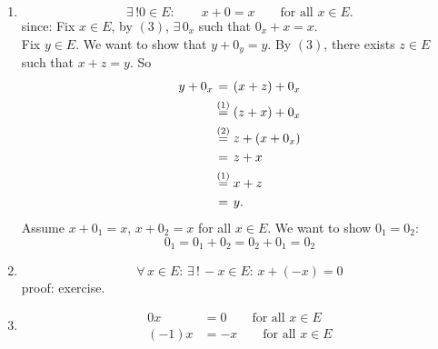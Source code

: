 \begin{bemerkung}
	\begin{enumerate}[(1)]
		\item \[
			\exists\,! 0 \in E: \qquad x + 0 = x \qquad \text{for all }x \in E.
		\]
		since: Fix $x \in E$, by $(3)$, $\exists\, 0_x$ such that $0_x + x =x$. \\
		Fix $y \in E$. We want to show that $y + 0_y = y$. By $(3)$, there exists $z \in E$ such that $x+z = y$. So
		\begin{align*}
			y + 0_x & \stackrel{\hphantom{(1)}}{=} (x+z)+ 0_x \\
			&\stackrel{(1)}{=} (z+x)+ 0_x \\
			&\stackrel{(2)}{=} z + (x + 0_x) \\
			&\stackrel{\hphantom{(1)}}{=} z+x \\
			&\stackrel{(1)}{=}x+z \\
			&\stackrel{\hphantom{(1)}}{=} y.
		\end{align*}
		Assume $x+ 0_1 = x$, $x+ 0_2 =x$ for all $x \in E$. We want to show $0_1 = 0_2$:
		\[
			0_1 = 0_1 + 0_2 = 0_2 + 0_1 = 0_2
		\]
		\item 
		\[
			\forall\, x \in E: \, \exists\,! \,-x \in E: \,x+(-x)=0
		\]
		proof: exercise.
		\item \begin{align*}
			0x &=0 \qquad \text{for all }x \in E \\
			(-1)x &= -x \qquad \text{for all }x \in E
		\end{align*}
	\end{enumerate}
\end{bemerkung}
